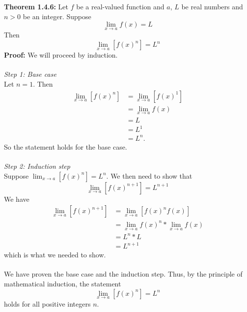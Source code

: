 \documentclass{article}
\begin{document}
	\textbf{Theorem 1.4.6:} Let $f$ be a real-valued function and $a$, $L$ be real numbers and $n > 0$ be an integer. Suppose
	$$\lim_{x \to a}{f(x)} = L$$
	Then
	$$\lim_{x \to a}[{f(x)^n}] = L^n$$
	\textbf{Proof:}
	We will proceed by induction. \\\\
	\textit{Step 1: Base case} \\
	Let $n = 1.$ Then
	\begin{align*}
		\lim_{x \to a}[{f(x)^n}] &= \lim_{x \to a}[{f(x)^1}] \\
		                         &= \lim_{x \to a}{f(x)} \\
		                         &= L \\
		                         &= L^1 \\
		                         &= L^n.
	\end{align*}
	So the statement holds for the base case. \\\\
	\textit{Step 2: Induction step} \\
	Suppose $\lim_{x \to a}[{f(x)^n}] = L^n$. We then need to show that
	$$\lim_{x \to a}[{f(x)^{n+1}}] = L^{n+1}$$
	We have
	\begin{align*}
		\lim_{x \to a}[{f(x)^{n+1}}] &= \lim_{x \to a}[{f(x)^nf(x)}] \\
		                             &= \lim_{x \to a}{f(x)^n} * \lim_{x \to a}{f(x)} \tag{Theorem 1.4.2} \\
		                             &= L^n * L \\
		                             &= L^{n+1}
	\end{align*}
	which is what we needed to show. \\\\
	We have proven the base case and the induction step. Thus, by the principle of mathematical induction, the statement 
	$$\lim_{x \to a}[{f(x)^n}] = L^n$$
	holds for all positive integers $n$.
\end{document}
